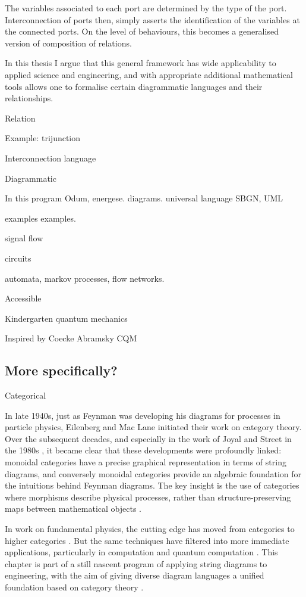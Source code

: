 
The variables associated to each port are determined by the type of the port.
Interconnection of ports then, simply asserts the identification of the
variables at the connected ports. On the level of behaviours, this becomes a
generalised version of composition of relations.

In this thesis I argue that this general framework has wide applicability to
applied science and engineering, and with appropriate additional mathematical
tools allows one to formalise certain diagrammatic languages and their
relationships.

Relation

Example: trijunction

Interconnection language

Diagrammatic

In this program Odum, energese. diagrams. universal language SBGN, UML

examples examples.


signal flow

circuits

automata, markov processes, flow networks.

Accessible

Kindergarten quantum mechanics

Inspired by Coecke Abramsky CQM


\subsection*{More specifically?}

Categorical

In late 1940s, just as Feynman was developing his diagrams for processes in
particle physics, Eilenberg and Mac Lane initiated their work on category
theory.  Over the subsequent decades, and especially in the work of Joyal and
Street in the 1980s \cite{JS91,JS93}, it became clear that these developments were profoundly linked: monoidal categories have a precise graphical representation in terms of string diagrams, and conversely monoidal categories provide an algebraic foundation for the intuitions behind Feynman diagrams.  The key insight is the use of categories where morphisms describe physical processes, rather than structure-preserving maps between mathematical objects \cite{BaezStay,CP}.

In work on fundamental physics, the cutting edge has moved from categories
to higher categories \cite{BL}.  But the same techniques have filtered into more
immediate applications, particularly in computation and quantum computation
\cite{AC04,Ba1,Sel07}.  This chapter is part of a still nascent program of
applying string diagrams to engineering, with the aim of giving diverse diagram
languages a unified foundation based on category theory \cite{BE,BSZ,KSW,RSW05,Sp}. 

